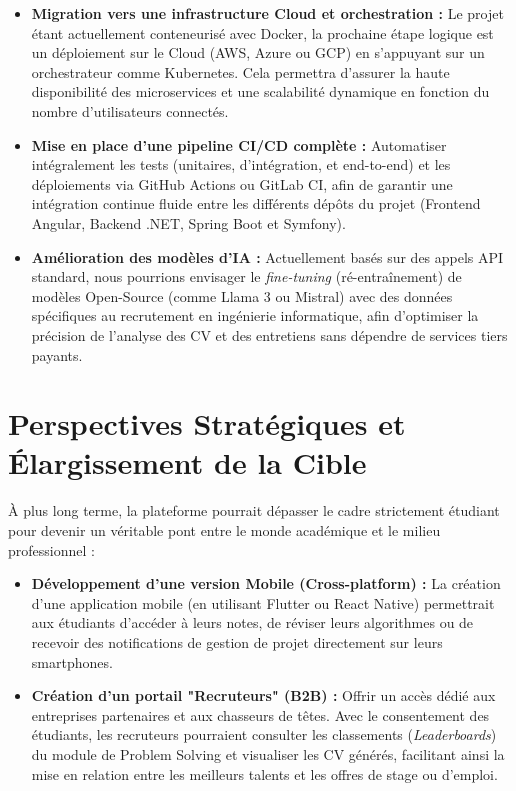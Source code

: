 \documentclass[12pt,a4paper]{report}
\begin{document}
	\begin{itemize}
		\item \textbf{Migration vers une infrastructure Cloud et orchestration :} Le projet étant actuellement conteneurisé avec Docker, la prochaine étape logique est un déploiement sur le Cloud (AWS, Azure ou GCP) en s'appuyant sur un orchestrateur comme Kubernetes. Cela permettra d'assurer la haute disponibilité des microservices et une scalabilité dynamique en fonction du nombre d'utilisateurs connectés.
		\item \textbf{Mise en place d'une pipeline CI/CD complète :} Automatiser intégralement les tests (unitaires, d'intégration, et end-to-end) et les déploiements via GitHub Actions ou GitLab CI, afin de garantir une intégration continue fluide entre les différents dépôts du projet (Frontend Angular, Backend .NET, Spring Boot et Symfony).
		\item \textbf{Amélioration des modèles d'IA :} Actuellement basés sur des appels API standard, nous pourrions envisager le \textit{fine-tuning} (ré-entraînement) de modèles Open-Source (comme Llama 3 ou Mistral) avec des données spécifiques au recrutement en ingénierie informatique, afin d'optimiser la précision de l'analyse des CV et des entretiens sans dépendre de services tiers payants.
	\end{itemize}
	
	\section*{Perspectives Stratégiques et Élargissement de la Cible}
	
	À plus long terme, la plateforme pourrait dépasser le cadre strictement étudiant pour devenir un véritable pont entre le monde académique et le milieu professionnel :
	
	\begin{itemize}
		\item \textbf{Développement d'une version Mobile (Cross-platform) :} La création d'une application mobile (en utilisant Flutter ou React Native) permettrait aux étudiants d'accéder à leurs notes, de réviser leurs algorithmes ou de recevoir des notifications de gestion de projet directement sur leurs smartphones.
		\item \textbf{Création d'un portail "Recruteurs" (B2B) :} Offrir un accès dédié aux entreprises partenaires et aux chasseurs de têtes. Avec le consentement des étudiants, les recruteurs pourraient consulter les classements (\textit{Leaderboards}) du module de Problem Solving et visualiser les CV générés, facilitant ainsi la mise en relation entre les meilleurs talents et les offres de stage ou d'emploi.
	\end{itemize}
	
\end{document}
